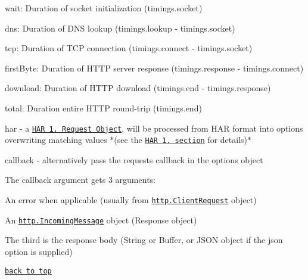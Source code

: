 \begin{DoxyItemize}
\begin{DoxyItemize}
\begin{DoxyItemize}
\item {\ttfamily wait}\+: Duration of socket initialization ({\ttfamily timings.\+socket})
\item {\ttfamily dns}\+: Duration of D\+NS lookup ({\ttfamily timings.\+lookup} -\/ {\ttfamily timings.\+socket})
\item {\ttfamily tcp}\+: Duration of T\+CP connection ({\ttfamily timings.\+connect} -\/ {\ttfamily timings.\+socket})
\item {\ttfamily first\+Byte}\+: Duration of H\+T\+TP server response ({\ttfamily timings.\+response} -\/ {\ttfamily timings.\+connect})
\item {\ttfamily download}\+: Duration of H\+T\+TP download ({\ttfamily timings.\+end} -\/ {\ttfamily timings.\+response})
\item {\ttfamily total}\+: Duration entire H\+T\+TP round-\/trip ({\ttfamily timings.\+end})
\end{DoxyItemize}
\end{DoxyItemize}
\item {\ttfamily har} -\/ a \href{http://www.softwareishard.com/blog/har-12-spec/#request}{\tt H\+AR 1. Request Object}, will be processed from H\+AR format into options overwriting matching values $\ast$(see the \href{#support-for-har-1.2}{\tt H\+AR 1. section} for details)$\ast$
\item {\ttfamily callback} -\/ alternatively pass the request\textquotesingle{}s callback in the options object
\end{DoxyItemize}

The callback argument gets 3 arguments\+:


\begin{DoxyEnumerate}
\item An {\ttfamily error} when applicable (usually from \href{http://nodejs.org/api/http.html#http_class_http_clientrequest}{\tt {\ttfamily http.\+Client\+Request}} object)
\item An \href{https://nodejs.org/api/http.html#http_class_http_incomingmessage}{\tt {\ttfamily http.\+Incoming\+Message}} object (Response object)
\item The third is the {\ttfamily response} body ({\ttfamily String} or {\ttfamily Buffer}, or J\+S\+ON object if the {\ttfamily json} option is supplied)
\end{DoxyEnumerate}

\href{#table-of-contents}{\tt back to top}





